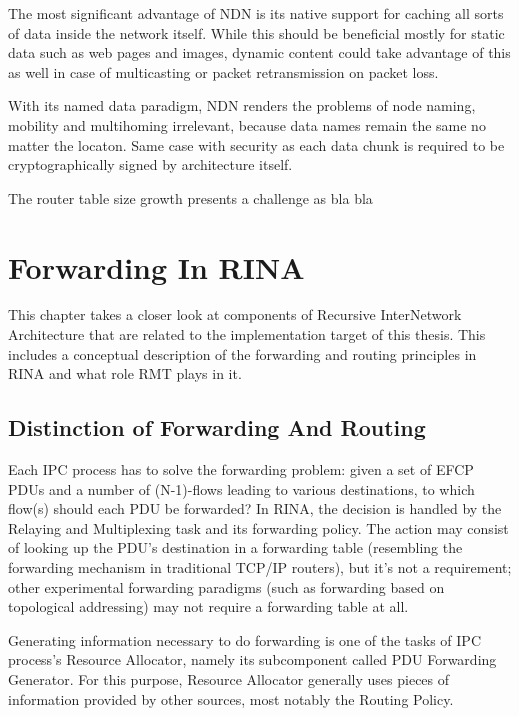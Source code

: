             The most significant advantage of NDN is its native support for caching all sorts of data inside the network itself. While this should be beneficial mostly for static data such as web pages and images, dynamic content could take advantage of this as well in case of multicasting or packet retransmission on packet loss.

            With its named data paradigm, NDN renders the problems of node naming, mobility and multihoming irrelevant, because data names remain the same no matter the locaton. Same case with security as each data chunk is required to be cryptographically signed by architecture itself.

            The router table size growth presents a challenge as bla bla



\chapter{Forwarding In RINA}\label{forwarding}

    This chapter takes a closer look at components of Recursive InterNetwork Architecture that are related to the implementation target of this thesis. This includes a conceptual description of the forwarding and routing principles in RINA and what role RMT plays in it.

    \section{Distinction of Forwarding And Routing}

        Each IPC process has to solve the forwarding problem: given a set of EFCP PDUs and a number of (N-1)-flows leading to various destinations, to which flow(s) should each PDU be forwarded? In RINA, the decision is handled by the Relaying and Multiplexing task and its forwarding policy. The action may consist of looking up the PDU's destination in a forwarding table (resembling the forwarding mechanism in traditional TCP/IP routers), but it's not a requirement; other experimental forwarding paradigms (such as forwarding based on topological addressing) may not require a forwarding table at all.

        Generating information necessary to do forwarding is one of the tasks of IPC process's Resource Allocator, namely its subcomponent called PDU Forwarding Generator. For this purpose, Resource Allocator generally uses pieces of information provided by other sources, most notably the Routing Policy.

